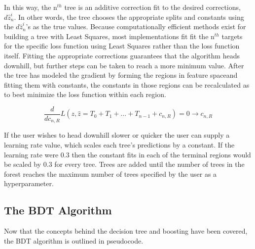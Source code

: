 \documentclass[12pt]{article}
\begin{document}
In this way, the n$^{th}$ tree is an additive correction fit to the desired corrections, $d\hat{z}^{i}_{n}$. In other words, the tree chooses the appropriate splits and constants using the $d\hat{z}^{i}_{n}$'s as the true values. Because computationally efficient methods exist for building a tree with Least Squares, most implementations fit fit the n$^{th}$ targets for the specific loss function using Least Squares rather than the loss function itself. Fitting the appropriate corrections guarantees that the algorithm heads downhill, but further steps can be taken to reach a more minimum value. After the tree has modeled the gradient by forming the regions in feature spaceand fitting them with constants, the constants in those regions can be recalculated as to best minimize the loss function within each region. 

\begin{equation}
\frac{d}{dc_{n,R}} L(z,\hat{z} = T_0 + T_1 + ... + T_{n-1} + c_{n,R}) = 0 \rightarrow c_{n,R}
\end{equation}

If the user wishes to head downhill slower or quicker the user can supply a learning rate value, which scales each tree's predictions by a constant. If the learning rate were 0.3 then the constant fits in each of the terminal regions would be scaled by 0.3 for every tree. Trees are added until the number of trees in the forest reaches the maximum number of trees specified by the user as a hyperparameter.


\subsection{The BDT Algorithm}

Now that the concepts behind the decision tree and boosting have been covered, the BDT algorithm is outlined in pseudocode.
\end{document}
